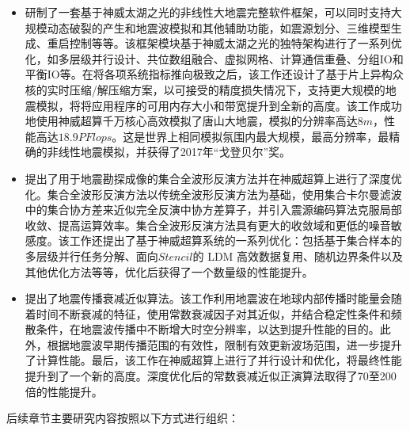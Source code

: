 \begin{itemize}
  \item 研制了一套基于神威太湖之光的非线性大地震完整软件框架，可以同时支持大规模动态破裂的产生和地震波模拟和其他辅助功能，如震源划分、三维模型生成、重启控制等等。该框架模块基于神威太湖之光的独特架构进行了一系列优化，如多层级并行设计、共位数组融合、虚拟网格、计算通信重叠、分组IO和平衡IO等。在将各项系统指标推向极致之后，该工作还设计了基于片上异构众核的实时压缩/解压缩方案，以可接受的精度损失情况下，支持更大规模的地震模拟，将将应用程序的可用内存大小和带宽提升到全新的高度。该工作成功地使用神威超算千万核心高效模拟了唐山大地震，模拟的分辨率高达$8m$，性能高达$18.9PFlops$。这是世界上相同模拟氛围内最大规模，最高分辨率，最精确的非线性地震模拟，并获得了2017年“戈登贝尔”奖。

  \item 提出了用于地震勘探成像的集合全波形反演方法并在神威超算上进行了深度优化。集合全波形反演方法以传统全波形反演方法为基础，使用集合卡尔曼滤波中的集合协方差来近似完全反演中协方差算子，并引入震源编码算法克服局部收敛、提高运算效率。集合全波形反演方法具有更大的收敛域和更低的噪音敏感度。该工作还提出了基于神威超算系统的一系列优化：包括基于集合样本的多层级并行任务分解、面向$Stencil$的 LDM 高效数据复用、随机边界条件以及其他优化方法等等，优化后获得了一个数量级的性能提升。

  \item 提出了地震传播衰减近似算法。该工作利用地震波在地球内部传播时能量会随着时间不断衰减的特征，使用常数衰减因子对其近似，并结合稳定性条件和频散条件，在地震波传播中不断增大时空分辨率，以达到提升性能的目的。此外，根据地震波早期传播范围的有效性，限制有效更新波场范围，进一步提升了计算性能。最后，该工作在神威超算上进行了并行设计和优化，将最终性能提升到了一个新的高度。深度优化后的常数衰减近似正演算法取得了70至200倍的性能提升。

\end{itemize}

后续章节主要研究内容按照以下方式进行组织：
